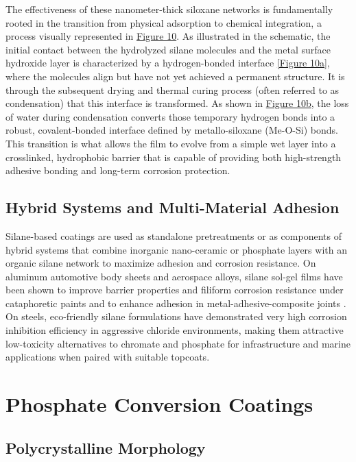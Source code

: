 \documentclass[12pt]{article}
\begin{document}
            The effectiveness of these nanometer-thick siloxane networks is fundamentally rooted in the transition from physical adsorption to chemical integration, a process visually represented in \hyperref[silane_process]{Figure 10}. As illustrated in the schematic, the initial contact between the hydrolyzed silane molecules and the metal surface hydroxide layer is characterized by a hydrogen-bonded interface \hyperref[silane_process]{[Figure 10a]}, where the molecules align but have not yet achieved a permanent structure. It is through the subsequent drying and thermal curing process (often referred to as condensation) that this interface is transformed. As shown in \hyperref[silane_process]{Figure 10b}, the loss of water during condensation converts those temporary hydrogen bonds into a robust, covalent-bonded interface defined by metallo-siloxane (Me-O-Si) bonds. This transition is what allows the film to evolve from a simple wet layer into a crosslinked, hydrophobic barrier that is capable of providing both high-strength adhesive bonding and long-term corrosion protection.

        \subsection{Hybrid Systems and Multi-Material Adhesion}

            Silane-based coatings are used as standalone pretreatments or as components of hybrid systems that combine inorganic nano-ceramic or phosphate layers with an organic silane network to maximize adhesion and corrosion resistance. On aluminum automotive body sheets and aerospace alloys, silane sol-gel films have been shown to improve barrier properties and filiform corrosion resistance under cataphoretic paints and to enhance adhesion in metal-adhesive-composite joints \autocite{jiang_silane-incorporated_2015}. On steels, eco-friendly silane formulations have demonstrated very high corrosion inhibition efficiency in aggressive chloride environments, making them attractive low-toxicity alternatives to chromate and phosphate for infrastructure and marine applications when paired with suitable topcoats.

    \section{Phosphate Conversion Coatings}
        \subsection{Polycrystalline Morphology}
\end{document}

